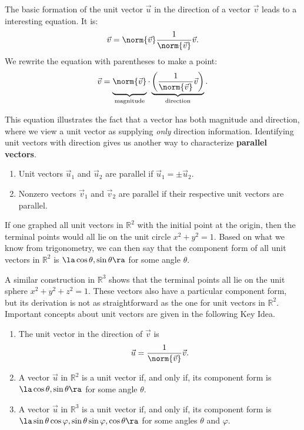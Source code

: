 The basic formation of the unit vector $\vec u$ in the direction of a vector $\vec v$ leads to a interesting equation. It is:
\[
\vec v = \norm{\vec v}\frac{1}{\norm{\vec v}}\vec v.
\]
We rewrite the equation with parentheses to make a point:
\[
\vec v = \underbrace{\rule[-9.5pt]{0pt}{15pt}\norm{\vec v}}_{\text{\scriptsize magnitude}}\cdot\underbrace{\left(\frac{1}{\norm{\vec v}}\vec v\right)}_{\text{\scriptsize direction}}.
\]

This equation illustrates the fact that a vector has both magnitude and direction, where we view a unit vector as supplying \textit{only} direction information. Identifying unit vectors with direction gives us another way to characterize \textbf{parallel vectors}.

{\begin{enumerate}
	\item Unit vectors $\vec u_1$ and $\vec u_2$ are parallel if $\vec u_1 = \pm \vec u_2$.
	\item	Nonzero vectors $\vec v_1$ and $\vec v_2$ are parallel if their respective unit vectors are parallel.
\end{enumerate}
}


If one graphed all unit vectors in $\mathbb{R}^2$ with the initial point at the origin, then the terminal points would all lie on the unit circle $x^2+y^2=1$. Based on what we know from trigonometry, we can then say that the component form of all unit vectors in $\mathbb{R}^2$ is $\la \cos\theta,\sin\theta\ra$ for some angle $\theta$.

A similar construction in $\mathbb{R}^3$ shows that the terminal points all lie on the unit sphere $x^2+y^2+z^2=1$. These vectors also have a particular component form, but its derivation is not as straightforward as the one for unit vectors in $\mathbb{R}^2$. Important concepts about unit vectors are given in the  following Key Idea. 

{\begin{enumerate}
\item		The unit vector in the direction of $\vec v$ is 
\[
 \vec u = \frac1{\norm{\vec v}} \vec v.
\]

\item A vector $\vec u$ in $\mathbb{R}^2$ is a unit vector if, and only if, its component form is $\la \cos\theta,\sin\theta\ra$ for some angle $\theta$.
	\item		A vector $\vec u$ in $\mathbb{R}^3$ is a unit vector if, and only if, its component form is $\la \sin\theta\cos\varphi,\sin\theta\sin\varphi,\cos\theta\ra$ for some angles $\theta$ and $\varphi$.
\end{enumerate}
}

